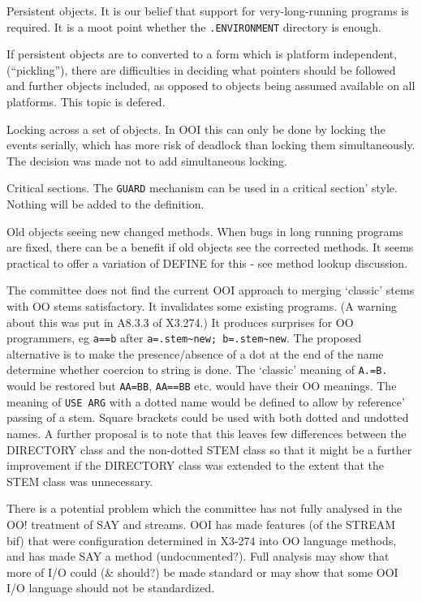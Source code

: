 Persistent objects. It is our belief that support for very-long-running
programs is required. It is a moot point whether the
\texttt{.ENVIRONMENT} directory is enough.

If persistent objects are to converted to a form which is platform
independent, (``pickling''), there are difficulties in deciding what
pointers should be followed and further objects included, as opposed to
objects being assumed available on all platforms. This topic is defered.

Locking across a set of objects. In OOI this can only be done by locking
the events serially, which has more risk of deadlock than locking them
simultaneously. The decision was made not to add simultaneous locking.

Critical sections. The \texttt{GUARD} mechanism can be used in a
critical section' style. Nothing will be added to the definition.

Old objects seeing new changed methods. When bugs in long running
programs are fixed, there can be a benefit if old objects see the
corrected methods. It seems practical to offer a variation of DEFINE for
this - see method lookup discussion.

The committee does not find the current OOI approach to merging
`classic' stems with OO stems satisfactory. It invalidates some existing
programs. (A warning about this was put in A8.3.3 of X3.274.) It
produces surprises for OO programmers, eg \texttt{a==b} after
\texttt{a=.stem\textasciitilde{}new;\ b=.stem\textasciitilde{}new}. The
proposed alternative is to make the presence/absence of a dot at the end
of the name determine whether coercion to string is done. The `classic'
meaning of \texttt{A.=B.} would be restored but \texttt{AA=BB},
\texttt{AA==BB} etc. would have their OO meanings. The meaning of
\texttt{USE\ ARG} with a dotted name would be defined to allow by
reference' passing of a stem. Square brackets could be used with both
dotted and undotted names. A further proposal is to note that this
leaves few differences between the DIRECTORY class and the non-dotted
STEM class so that it might be a further improvement if the DIRECTORY
class was extended to the extent that the STEM class was unnecessary.

There is a potential problem which the committee has not fully analysed
in the OO! treatment of SAY and streams. OOI has made features (of the
STREAM bif) that were configuration determined in X3-274 into OO
language methods, and has made SAY a method (undocumented?). Full
analysis may show that more of I/O could (\& should?) be made standard
or may show that some OOI I/O language should not be standardized.

